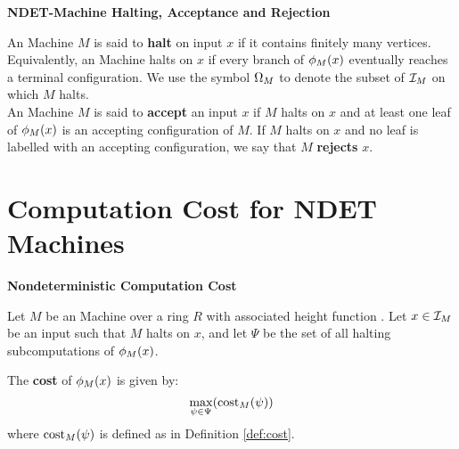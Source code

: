 
\begin{definition} \textbf{NDET-Machine Halting, Acceptance and Rejection}

  An \ndet Machine $M$ is said to \textbf{halt} on input $x$ if it
  contains finitely many vertices.  Equivalently, an \ndet Machine
  halts on $x$ if every branch of $\phi_M(x)$ eventually reaches a
  terminal configuration.  We use the symbol $\Omega_M$ to
  denote the subset of $\mathcal{I}_M$ on which $M$ halts.\\
  
  An \ndet Machine $M$ is said to \textbf{accept} an input $x$ if $M$
  halts on $x$ and at least one leaf of $\phi_M(x)$ is an
  accepting configuration of $M$. If $M$ halts on $x$ and no leaf is
  labelled with an accepting configuration, we say that $M$
  \textbf{rejects} $x$.
  
\end{definition}

\section{Computation Cost for  NDET Machines}

\begin{definition}{\textbf{Nondeterministic Computation Cost}}

  Let $M$ be an \ndet Machine over a ring $R$ with associated height
  function .  Let $x \in \mathcal{I}_M$ be an
  input such that $M$ halts on $x$, and let $\Psi$ be the set of all
  halting subcomputations of $\phi_M(x)$.

  The \textbf{cost} of $\phi_M(x)$ is given
  by: $$\max\limits_{\psi \in \Psi}(\text{cost}_M(\psi))$$ where
  $\text{cost}_M(\psi)$ is defined as in Definition \ref{def:cost}.

\end{definition}

